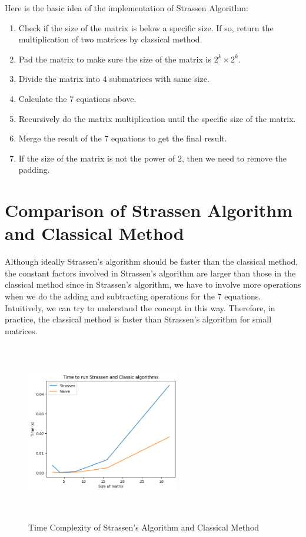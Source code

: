 \documentclass{article}
\begin{document}
Here is the basic idea of the implementation of Strassen Algorithm:
\begin{enumerate}
    \item Check if the size of the matrix is below a specific size. If so, return the multiplication of two matrices by classical method.
    \item Pad the matrix to make sure the size of the matrix is $2^k \times 2^k$.
    \item Divide the matrix into $4$ submatrices with same size.
    \item Calculate the $7$ equations above.
    \item Recursively do the matrix multiplication until the specific size of the matrix.
    \item Merge the result of the $7$ equations to get the final result.
    \item If the size of the matrix is not the power of $2$, then we need to remove the padding.
\end{enumerate}

\section{Comparison of Strassen Algorithm and Classical Method}
\hspace{5.5mm}Although ideally Strassen's algorithm should be faster than the classical method, the constant factors involved in Strassen's algorithm are larger than those in the classical method since in Strassen's algorithm,
we have to involve more operations when we do the adding and subtracting operations for the $7$ equations. Intuitively, we can try to understand the concept in this way. Therefore, in practice, the classical method is faster than Strassen's algorithm for small matrices.\\
\begin{figure}[htbp]
    \centering
    \includegraphics[width=0.6\textwidth, height=7.8cm]{figs/time_2.png}
    \caption{Time Complexity of Strassen's Algorithm and Classical Method}
\end{figure}
\end{document}
